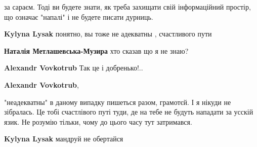 \begin{itemize}
\begin{itemize}
за сараєм. Тоді ви будете знати, як треба захищати свій інформаційний простір,
що означає "напалі" і не будете писати дурниць.

 
\textbf{Kylyna Lysak} понятно, вы тоже не адекватны , счастливого пути

 
\textbf{Наталія Метлашевська-Музира} хто сказав що я не знаю?

 
\textbf{Alexandr Vovkotrub} Так це і добренько!..

 
\textbf{Alexandr Vovkotrub}, 

"неадекватны" в даному випадку пишеться разом, грамотєй. І я нікуди не
зібралась. Це тобі счастлівого путі туди, де на тебе не будуть нападати за
усскій язик. Не розумію тільки, чому до цього часу тут затримався.


 
\textbf{Kylyna Lysak} мандруй не обертайся

 

\end{itemize}
\end{itemize}
